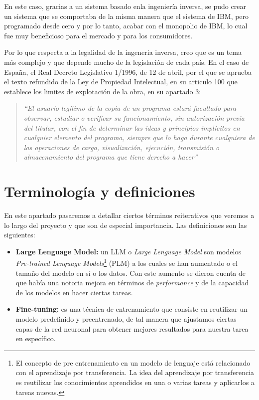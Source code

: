 En este caso, gracias a un sistema basado enla ingeniería inversa, se pudo crear un sistema que se comportaba
de la misma manera que el sistema de IBM, pero programado desde cero y por lo tanto, acabar con el monopolio 
de IBM, lo cual fue muy beneficioso para el mercado y para los consumidores.

Por lo que respecta a la legalidad de la ingeneria inversa, creo que es un tema más complejo y que depende
mucho de la legislación de cada país. En el caso de España, el Real Decreto Legislativo 1/1996, de 12 de abril,
por el que se aprueba el texto refundido de la Ley de Propiedad Intelectual, en su articulo 100 que establece
los limites de explotación de la obra, en su apartado 3\cite{LeyPropiedadIntelectual}: 

\begin{quote}
    \textit{``El usuario legítimo de la copia de un programa estará facultado para observar, estudiar o 
    verificar su funcionamiento, sin autorización previa del titular, con el fin de determinar las ideas
    y principios implícitos en cualquier elemento del programa, siempre que lo haga durante cualquiera de
    las operaciones de carga, visualización, ejecución, transmisión o almacenamiento del programa que tiene
    derecho a hacer''}
\end{quote}


\section{Terminología y definiciones}
\label{sec:terminalogia}


En este apartado pasaremos a detallar ciertos términos reiterativos que veremos a lo
largo del proyecto y que son de especial importancia. Las definiciones son las siguientes:

\begin{itemize}
    \item \textbf{Large Lenguage Model:} un LLM o \textit{Large Lenguage Model} son 
        modelos \textit{Pre-trained Lenguage Models}\footnote{El concepto de pre
        entrenamiento en un modelo de lenguaje está relacionado con el aprendizaje
        por transferencia. La idea del aprendizaje por transferencia es reutilizar
        los conocimientos aprendidos en una o varias tareas y aplicarlos a tareas
        nuevas.} (PLM) a los cuales se han aumentado o el tamaño del modelo en sí
        o los datos. Con este aumento se dieron cuenta de que había una notoria mejora
        en términos de \textit{performance} y de la capacidad de los modelos en hacer
        ciertas tareas. \cite{ZhaoWayneXin2023ASoL}
    \item \textbf{Fine-tuning:} es una técnica de entrenamiento que consiste en
        reutilizar un modelo predefinido y preentrenado, de tal manera que ajustamos
        ciertas capas de la red neuronal para obtener mejores resultados para nuestra
        tarea en específico.
\end{itemize}